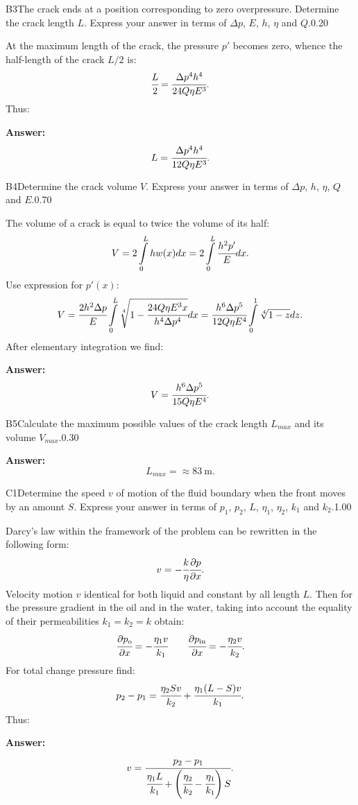 \documentclass[11pt,a4paper]{article}
\begin{document}
\begin{solcard}{B3}{The crack ends at a position corresponding to zero overpressure. Determine the crack length $L$. Express your answer in terms of $\Delta{p}$, $E$, $h$, $\eta$ and $Q$.}{0.20}

At the maximum length of the crack, the pressure $p'$ becomes zero, whence the half-length of the crack $L/2$ is: $$\cfrac{L}{2}=\cfrac{\Delta{p}^4h^4}{24Q\eta E^3}{.} $$Thus:

\par\smallskip\noindent\textbf{Answer:} $$L=\cfrac{\Delta{p}^4h^4}{12Q\eta E^3}{.} $$
\end{solcard}

\begin{solcard}{B4}{Determine the crack volume $V$. Express your answer in terms of $\Delta{p}$, $h$, $\eta$, $Q$ and $E$.}{0.70}

The volume of a crack is equal to twice the volume of its half: $$V=2\int\limits_{0}^{L}hw(x)dx=2\int\limits_{0}^{L}\cfrac{h^2p'}{E}dx{.} $$Use expression for $p'(x)$: $$V=\cfrac{2h^2\Delta{p}}{E}\int\limits_{0}^{L}\sqrt[4]{1-\cfrac{24Q\eta E^3x}{h^4\Delta{p}^4}}dx=\cfrac{h^6\Delta{p}^5}{12Q\eta E^4}\int\limits_{0}^{1}\sqrt[4]{1-z}dz{.} $$After elementary integration we find:

\par\smallskip\noindent\textbf{Answer:} $$V=\cfrac{h^6\Delta{p}^5}{15Q\eta E^4}{.} $$
\end{solcard}

\begin{solcard}{B5}{Calculate the maximum possible values of the crack length $L_{max}$ and its volume $V_{max}$.}{0.30}
\par\smallskip\noindent\textbf{Answer:} $$L_{max}=\approx 83~\text{m}{.} $$
\end{solcard}

\begin{solcard}{C1}{Determine the speed $v$ of motion of the fluid boundary when the front moves by an amount $S$. Express your answer in terms of $p_1$, $p_2$, $L$, $\eta_1$, $\eta_2$, $k_1$ and $k_2$.}{1.00}

Darcy's law within the framework of the problem can be rewritten in the following form: $$v=-\cfrac{k}{\eta}\cfrac{\partial p}{\partial x}{.} $$Velocity motion $v$ identical for both liquid and constant by all length $L$. Then for the pressure gradient in the oil and in the water, taking into account the equality of their permeabilities $k_1=k_2=k$ obtain: $$\cfrac{\partial p_\text{o}}{\partial x}=-\cfrac{\eta_1v}{k_1}\qquad \cfrac{\partial p_\text{in}}{\partial x}=-\cfrac{\eta_2v}{k_2}{.} $$For total change pressure find: $$p_2-p_1=\cfrac{\eta_2Sv}{k_2}+\cfrac{\eta_1(L-S)v}{k_1}{.} $$Thus:

\par\smallskip\noindent\textbf{Answer:} $$v=\cfrac{p_2-p_1}{\cfrac{\eta_1L}{k_1}+\left(\cfrac{\eta_2}{k_2}-\cfrac{\eta_1}{k_1}\right)S}{.} $$
\end{solcard}
\end{document}
